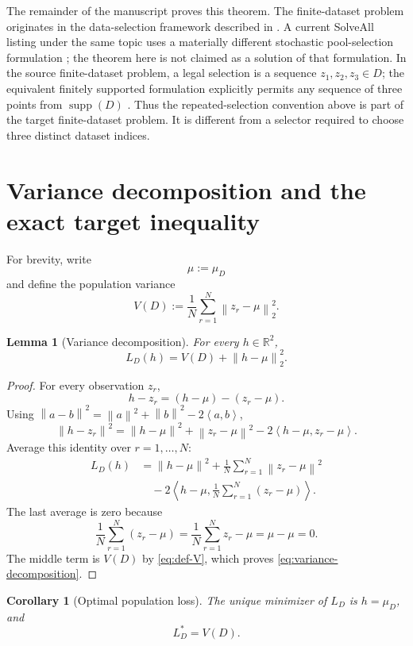 \documentclass[11pt]{article}
\newtheorem{lemma}[theorem]{Lemma}
\newtheorem{corollary}[theorem]{Corollary}
\theoremstyle{definition}
\theoremstyle{remark}
\newcommand{\R}{\mathbb{R}}
\newcommand{\supp}{\operatorname{supp}}
\newcommand{\ip}[2]{\left\langle #1,#2\right\rangle}
\newcommand{\norm}[1]{\left\lVert #1\right\rVert}
\begin{document}
The remainder of the manuscript proves this theorem.  The finite-dataset problem originates in the data-selection framework described in \cite{HMSYopen,HMSYerm}.  A current SolveAll listing under the same topic uses a materially different stochastic pool-selection formulation \cite{SolveAllDataSelection}; the theorem here is not claimed as a solution of that formulation.  In the source finite-dataset problem, a legal selection is a sequence $z_1,z_2,z_3\in D$; the equivalent finitely supported formulation explicitly permits any sequence of three points from $\supp(D)$ \cite[Appendix~A.2]{HMSYerm}.  Thus the repeated-selection convention above is part of the target finite-dataset problem.  It is different from a selector required to choose three distinct dataset indices.

\section{Variance decomposition and the exact target inequality}

For brevity, write
\[
\mu:=\mu_D
\]
and define the population variance
\begin{equation}
V(D):=\frac1N\sum_{r=1}^N\norm{z_r-\mu}_2^2.
\label{eq:def-V}
\end{equation}

\begin{lemma}[Variance decomposition]
For every $h\in\R^2$,
\begin{equation}
L_D(h)=V(D)+\norm{h-\mu}_2^2.
\label{eq:variance-decomposition}
\end{equation}
\end{lemma}

\begin{proof}
For every observation $z_r$,
\[
h-z_r=(h-\mu)-(z_r-\mu).
\]
Using $\norm{a-b}^2=\norm a^2+\norm b^2-2\ip ab$,
\[
\norm{h-z_r}^2
=\norm{h-\mu}^2+\norm{z_r-\mu}^2
-2\ip{h-\mu}{z_r-\mu}.
\]
Average this identity over $r=1,\ldots,N$:
\begin{align*}
L_D(h)
&=\norm{h-\mu}^2
  +\frac1N\sum_{r=1}^N\norm{z_r-\mu}^2 \\
&\quad
  -2\ip{h-\mu}{\frac1N\sum_{r=1}^N(z_r-\mu)}.
\end{align*}
The last average is zero because
\[
\frac1N\sum_{r=1}^N(z_r-\mu)
=\frac1N\sum_{r=1}^Nz_r-\mu
=\mu-\mu=0.
\]
The middle term is $V(D)$ by \eqref{eq:def-V}, which proves \eqref{eq:variance-decomposition}.
\end{proof}

\begin{corollary}[Optimal population loss]
The unique minimizer of $L_D$ is $h=\mu_D$, and
\begin{equation}
L_D^*=V(D).
\label{eq:Lstar-equals-V}
\end{equation}
\end{corollary}
\end{document}
